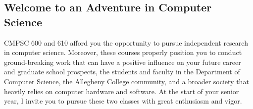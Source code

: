 \subsection*{Welcome to an Adventure in Computer Science}

CMPSC 600 and 610 afford you the opportunity to pursue independent research in computer science.  Moreover, these
courses properly position you to conduct ground-breaking work that can have a positive influence on your future career
and graduate school prospects, the students and faculty in the Department of Computer Science, the Allegheny College
community, and a broader society that heavily relies on computer hardware and software.  At the start of your senior
year, I invite you to pursue these two classes with great enthusiasm and vigor.

%

